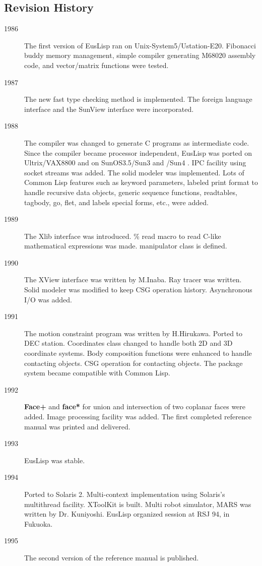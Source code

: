 \subsection{Revision History}
\begin{description}
\item[1986] The first version of EusLisp ran on Unix-System5/Ustation-E20.
Fibonacci buddy memory management, simple compiler generating M68020
assembly code, and vector/matrix functions were tested.
\item[1987] The new fast type checking method is implemented.
The foreign language interface and the SunView interface were incorporated.
\item[1988] The compiler was changed to generate C programs as
intermediate code. Since the compiler became processor independent,
EusLisp was ported on Ultrix/VAX8800 and on SunOS3.5/Sun3 and /Sun4 .
IPC facility using socket streams was added.
The solid modeler was implemented.
Lots of Common Lisp features such as keyword parameters, 
labeled print format to handle recursive data objects,
generic sequence functions,
readtables, tagbody, go, flet, and labels special forms, etc.,
were added.
\item[1989] The Xlib interface was introduced.
\% read macro to read C-like mathematical expressions was made.
manipulator class is defined.
\item[1990] The XView interface was written by M.Inaba.
Ray tracer was written.
Solid modeler was modified to keep CSG operation history.
Asynchronous I/O was added.
\item[1991] The motion constraint program was written by H.Hirukawa.
Ported to DEC station.
Coordinates class changed to handle both 2D and 3D coordinate systems.
Body composition functions were enhanced to handle contacting objects.
CSG operation for contacting objects.
The package system became compatible with Common Lisp.
\item[1992]
{\bf Face+} and {\bf face*} for union and intersection of two coplanar faces
were added.
Image processing facility was added. The first completed reference manual
was printed and delivered.
\item[1993] EusLisp was stable.
\item[1994] Ported to Solaris 2. Multi-context implementation using
Solaris's multithread facility. XToolKit is built. Multi robot simulator,
MARS was written by Dr. Kuniyoshi. EusLisp organized session at RSJ 94,
in Fukuoka.
\item[1995] The second version of the reference manual is published.

\end{description}
